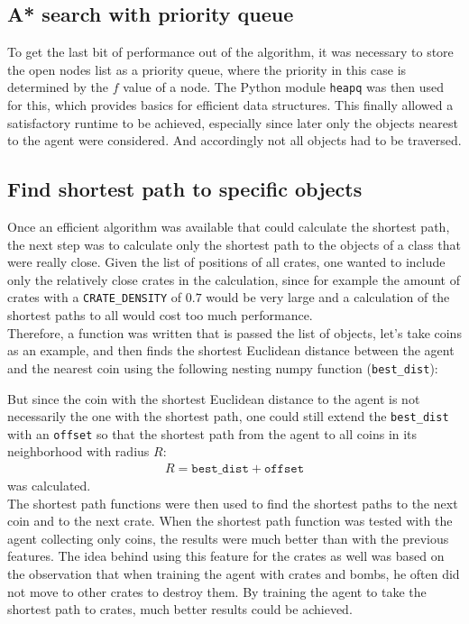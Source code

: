 \subsection{A* search with priority queue}
To get the last bit of performance out of the algorithm, it was necessary to store the open nodes list as a priority queue, where the priority in this case is determined by the $f$ value of a node. The Python module \texttt{heapq} was then used for this, which provides basics for efficient data structures. This finally allowed a satisfactory runtime to be achieved, especially since later only the objects nearest to the agent were considered. And accordingly not all objects had to be traversed.

\subsection{Find shortest path to specific objects}
Once an efficient algorithm was available that could calculate the shortest path, the next step was to calculate only the shortest path to the objects of a class that were really close. Given the list of positions of all crates, one wanted to include only the relatively close crates in the calculation, since for example the amount of crates with a \texttt{CRATE\_DENSITY} of $0.7$ would be very large and a calculation of the shortest paths to all would cost too much performance. 
\\

Therefore, a function was written that is passed the list of objects, let's take coins as an example, and then finds the shortest Euclidean distance between the agent and the nearest coin using the following nesting numpy function (\texttt{best\_dist}):
\vspace{0.1cm}

\vspace{0.1cm}
But since the coin with the shortest Euclidean distance to the agent is not necessarily the one with the shortest path, one could still extend the \texttt{best\_dist} with an \texttt{offset} so that the shortest path from the agent to all coins in its neighborhood with radius $R$:
\begin{align*}
R = \texttt{best\_dist} + \texttt{offset}
\end{align*}
was calculated.
\\

The shortest path functions were then used to find the shortest paths to the next coin and to the next crate. When the shortest path function was tested with the agent collecting only coins, the results were much better than with the previous features. The idea behind using this feature for the crates as well was based on the observation that when training the agent with crates and bombs, he often did not move to other crates to destroy them. By training the agent to take the shortest path to crates, much better results could be achieved.

